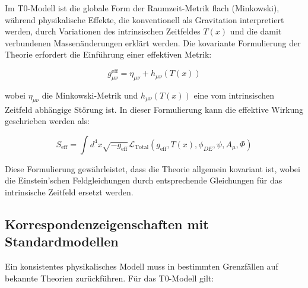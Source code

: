 \documentclass[a4paper,12pt]{article}
\theoremstyle{definition}
\theoremstyle{remark}
\newcommand{\Tfield}{T(x)} %
\begin{document}
	Im T0-Modell ist die globale Form der Raumzeit-Metrik flach (Minkowski), während physikalische Effekte, die konventionell als Gravitation interpretiert werden, durch Variationen des intrinsischen Zeitfeldes $\Tfield$ und die damit verbundenen Massenänderungen erklärt werden. Die kovariante Formulierung der Theorie erfordert die Einführung einer effektiven Metrik:
	
	\begin{equation}
		g_{\mu\nu}^{\text{eff}} = \eta_{\mu\nu} + h_{\mu\nu}(\Tfield)
	\end{equation}
	
	wobei $\eta_{\mu\nu}$ die Minkowski-Metrik und $h_{\mu\nu}(\Tfield)$ eine vom intrinsischen Zeitfeld abhängige Störung ist. In dieser Formulierung kann die effektive Wirkung geschrieben werden als:
	
	\begin{equation}
		S_{\text{eff}} = \int d^4x \sqrt{-g_{\text{eff}}} \mathcal{L}_{\text{Total}}(g_{\text{eff}}, \Tfield, \phi_{DE}, \psi, A_\mu, \Phi)
	\end{equation}
	
	Diese Formulierung gewährleistet, dass die Theorie allgemein kovariant ist, wobei die Einstein'schen Feldgleichungen durch entsprechende Gleichungen für das intrinsische Zeitfeld ersetzt werden.
	
	\subsection{Korrespondenzeigenschaften mit Standardmodellen}
	
	Ein konsistentes physikalisches Modell muss in bestimmten Grenzfällen auf bekannte Theorien zurückführen. Für das T0-Modell gilt:
	
\end{document}
